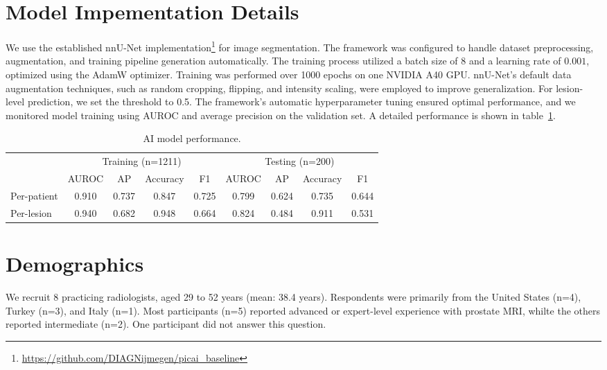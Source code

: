 
\section{Model Impementation Details}
\label{appen:model}

We use the established nnU-Net implementation\footnote{\url{https://github.com/DIAGNijmegen/picai_baseline}} for image segmentation.
The framework was configured to handle dataset preprocessing, augmentation, and training pipeline generation automatically. The training process utilized a batch size of 8 and a learning rate of $0.001$, optimized using the AdamW optimizer. Training was performed over 1000 epochs on one NVIDIA A40 GPU. nnU-Net's default data augmentation techniques, such as random cropping, flipping, and intensity scaling, were employed to improve generalization. For lesion-level prediction, we set the threshold to 0.5. The framework's automatic hyperparameter tuning ensured optimal performance, and we monitored model training using AUROC and average precision on the validation set.
A detailed performance is shown in table~\cref{tab:AI-results}.




\begin{table}[ht]
\begin{tabular}{@{}lcccccccc@{}}
\toprule
                   & \multicolumn{4}{c}{Training (n=1211)}        & \multicolumn{4}{c}{Testing (n=200)}         \\         \cmidrule(lr){2-5} \cmidrule(l){6-9}
                   & AUROC  & AP     & Accuracy & F1     & AUROC  & AP     & Accuracy & F1     \\
                   \midrule
Per-patient & 0.910 & 0.737 & 0.847   & 0.725 & 0.799 & 0.624 & 0.735    & 0.644 \\
Per-lesion       & 0.940 & 0.682 & 0.948   & 0.664 & 0.824 & 0.484 & 0.911   & 0.531 \\ \bottomrule
\end{tabular}
\label{tab:AI-results}
\caption{AI model performance.}
\end{table}




\section{Demographics}
\label{app:human_demographics}
We recruit 8 practicing radiologists, aged 29 to 52 years (mean: 38.4 years). Respondents were primarily from the United States (n=4), Turkey (n=3), and Italy (n=1). Most participants (n=5) reported advanced or expert-level experience with prostate MRI, whilte the others reported intermediate (n=2). One participant did not answer this question.  

